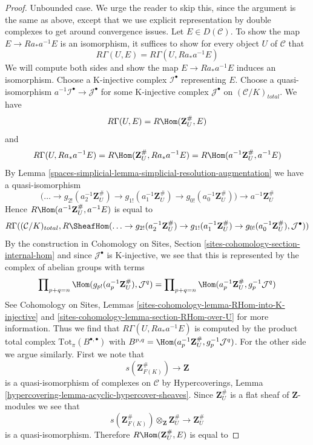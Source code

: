 \begin{proof}
\medskip\noindent
Unbounded case. We urge the reader to skip this, since the argument
is the same as above, except that we use explicit representation
by double complexes to get around convergence issues.
Let $E \in D(\mathcal{C})$.
To show the map $E \to Ra_*a^{-1}E$ is an isomorphism,
it suffices to show for every object $U$ of $\mathcal{C}$ that
$$
R\Gamma(U, E) = R\Gamma(U, Ra_*a^{-1}E)
$$
We will compute both sides and show the map $E \to Ra_*a^{-1}E$
induces an isomorphism. Choose a K-injective
complex $\mathcal{I}^\bullet$ representing $E$. Choose a quasi-isomorphism
$a^{-1}\mathcal{I}^\bullet \to \mathcal{J}^\bullet$
for some K-injective complex $\mathcal{J}^\bullet$ on
$(\mathcal{C}/K)_{total}$. We have
$$
R\Gamma(U, E) = R\Hom(\mathbf{Z}_U^\#, E)
$$
and
$$
R\Gamma(U, Ra_*a^{-1}E) = R\Hom(\mathbf{Z}_U^\#, Ra_*a^{-1}E) =
R\Hom(a^{-1}\mathbf{Z}_U^\#, a^{-1}E)
$$
By Lemma \ref{spaces-simplicial-lemma-simplicial-resolution-augmentation}
we have a quasi-isomorphism
$$
\Big(\ldots \to
g_{2!}(a_2^{-1}\mathbf{Z}_U^\#) \to
g_{1!}(a_1^{-1}\mathbf{Z}_U^\#) \to
g_{0!}(a_0^{-1}\mathbf{Z}_U^\#)\Big)
\longrightarrow
a^{-1}\mathbf{Z}_U^\#
$$
Hence $R\Hom(a^{-1}\mathbf{Z}_U^\#, a^{-1}E)$ is equal to
$$
R\Gamma((\mathcal{C}/K)_{total},
R\SheafHom(
\ldots \to
g_{2!}(a_2^{-1}\mathbf{Z}_U^\#) \to
g_{1!}(a_1^{-1}\mathbf{Z}_U^\#) \to
g_{0!}(a_0^{-1}\mathbf{Z}_U^\#),
\mathcal{J}^\bullet))
$$
By the construction in Cohomology on Sites, Section
\ref{sites-cohomology-section-internal-hom}
and since $\mathcal{J}^\bullet$ is K-injective, we see that
this is represented by the complex of abelian groups with terms
$$
\prod\nolimits_{p + q = n}
\Hom(g_{p!}(a_p^{-1}\mathbf{Z}_U^\#), \mathcal{J}^q) =
\prod\nolimits_{p + q = n}
\Hom(a_p^{-1}\mathbf{Z}_U^\#, g_p^{-1}\mathcal{J}^q)
$$
See Cohomology on Sites, Lemmas
\ref{sites-cohomology-lemma-RHom-into-K-injective} and
\ref{sites-cohomology-lemma-section-RHom-over-U} for more information.
Thus we find that $R\Gamma(U, Ra_*a^{-1}E)$ is computed by
the product total complex $\text{Tot}_\pi(B^{\bullet, \bullet})$
with $B^{p, q} = \Hom(a_p^{-1}\mathbf{Z}_U^\#, g_p^{-1}\mathcal{J}^q)$.
For the other side we argue similarly. First we note that
$$
s(\mathbf{Z}_{F(K)}^\#) \longrightarrow \mathbf{Z}
$$
is a quasi-isomorphism of complexes on $\mathcal{C}$
by Hypercoverings, Lemma \ref{hypercovering-lemma-acyclic-hypercover-sheaves}.
Since $\mathbf{Z}_U^\#$ is a flat sheaf of $\mathbf{Z}$-modules
we see that
$$
s(\mathbf{Z}_{F(K)}^\#) \otimes_\mathbf{Z} \mathbf{Z}_U^\#
\longrightarrow
\mathbf{Z}_U^\#
$$
is a quasi-isomorphism. Therefore
$R\Hom(\mathbf{Z}_U^\#, E)$ is equal to

\end{proof}
